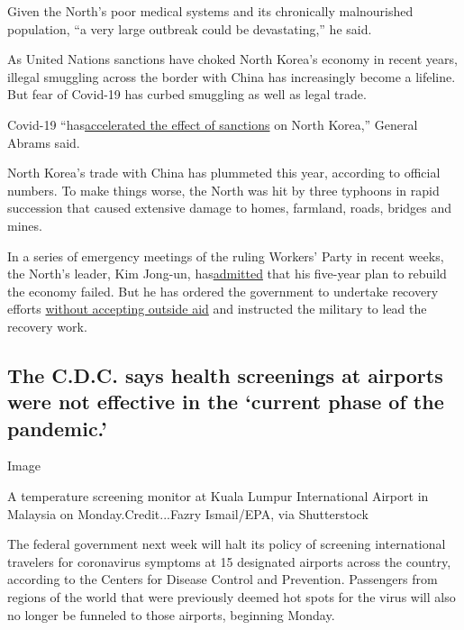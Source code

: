 Given the North's poor medical systems and its chronically malnourished
population, ``a very large outbreak could be devastating,'' he said.

As United Nations sanctions have choked North Korea's economy in recent
years, illegal smuggling across the border with China has increasingly
become a lifeline. But fear of Covid-19 has curbed smuggling as well as
legal trade.

Covid-19
``has\href{https://www.nytimes3xbfgragh.onion/2020/07/04/world/asia/north-korea-sanctions-coronavirus.html}{accelerated
the effect of sanctions} on North Korea,'' General Abrams said.

North Korea's trade with China has plummeted this year, according to
official numbers. To make things worse, the North was hit by three
typhoons in rapid succession that caused extensive damage to homes,
farmland, roads, bridges and mines.

In a series of emergency meetings of the ruling Workers' Party in recent
weeks, the North's leader, Kim Jong-un,
has\href{https://www.nytimes3xbfgragh.onion/2020/08/19/world/asia/north-korea-economy-coronavirus.html}{admitted}
that his five-year plan to rebuild the economy failed. But he has
ordered the government to undertake recovery efforts
\href{https://www.nytimes3xbfgragh.onion/2020/08/14/world/asia/north-korea-floods-coronavirus.html}{without
accepting outside aid} and instructed the military to lead the recovery
work.

\hypertarget{the-cdc-says-health-screenings-at-airports-were-not-effective-in-the-current-phase-of-the-pandemic}{%
\subsection{The C.D.C. says health screenings at airports were not
effective in the `current phase of the
pandemic.'}\label{the-cdc-says-health-screenings-at-airports-were-not-effective-in-the-current-phase-of-the-pandemic}}

Image

A temperature screening monitor at Kuala Lumpur International Airport in
Malaysia on Monday.Credit...Fazry Ismail/EPA, via Shutterstock

The federal government next week will halt its policy of screening
international travelers for coronavirus symptoms at 15 designated
airports across the country, according to the Centers for Disease
Control and Prevention. Passengers from regions of the world that were
previously deemed hot spots for the virus will also no longer be
funneled to those airports, beginning Monday.

